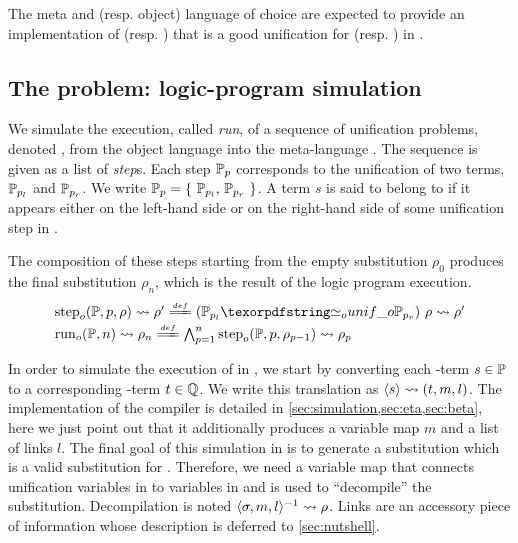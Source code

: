 \noindent
The meta and (resp. object) language of choice are expected to provide 
an implementation of \Ue (resp. \Uo) that is a good unification for \Ee (resp. \Eo)
in \llambda.

\subsection{The problem: logic-program simulation}

We simulate the execution, called \emph{run}, of a sequence of
unification problems, denoted \foUnifPb, from the object language \Fo
into the meta-language \Ho.
The sequence \foUnifPb is given as a list of \emph{step}s. Each step
$\mathbb{P}_p$ corresponds to the unification of two terms,
$\mathbb{P}_{p_l}$ and $\mathbb{P}_{p_r}$. We write
$\mathbb{P}_p = \{~ \mathbb{P}_{p_l},\, \mathbb{P}_{p_r} ~\}$.
A term $s$ is said to belong to \foUnifPb if it appears either on the
left-hand side or on the right-hand side of some unification step
in \foUnifPb.

The composition of these steps starting from the
empty substitution $\rho_0$ produces the final
substitution $\rho_n$, which is the result of the
logic program execution.
%
%
$$
\begin{array}{l}
\stepF{\foUnifPb}{p}{\rho}{\rho'}
\deff
\stepFD{\foUnifPb}{p}{\rho}{\rho'}\vspace{2pt}\\
\runF{\foUnifPb}{n}{\rho}
\deff
\runFD{\foUnifPb}{n}
\end{array}
$$

\noindent
In order to simulate the execution of \frun in \Ho, we start by converting
each \Fo{}-term $s \in \mathbb{P}$ to a corresponding \Ho{}-term $t \in \mathbb{Q}$.
We write this translation as $\langle s \rangle\rightsquigarrow(t,m,l)$. The implementation of the compiler
is detailed in \cref{sec:simulation,sec:eta,sec:beta}, here we just point
out that it additionally produces a variable map $m$ and a list of links $l$.
The final goal of this simulation in \Ho is to generate a substitution which is 
a valid substitution for \Fo. Therefore, we need a 
variable map that connects unification variables in \Ho to variables
in \Fo{} and is used to ``decompile'' the substitution. Decompilation is noted
$\langle \sigma,m,l \rangle^{-1}\rightsquigarrow \rho$. Links are an accessory piece of information whose
description is deferred to \cref{sec:nutshell}.

